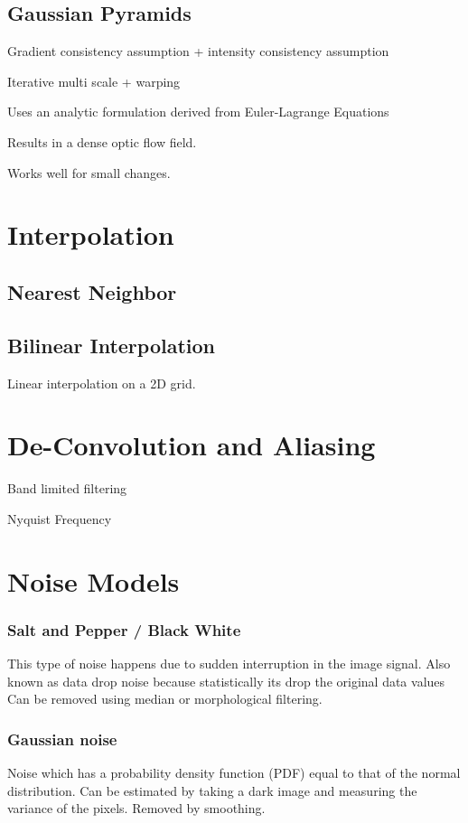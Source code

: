 \subsection{Gaussian Pyramids}

Gradient consistency assumption + intensity consistency assumption

Iterative multi scale + warping

Uses an analytic formulation derived from Euler-Lagrange Equations

Results in a dense optic flow field.

Works well for small changes.

\section{Interpolation}


\subsection{Nearest Neighbor}

\subsection{Bilinear Interpolation}

Linear interpolation on a 2D grid. 

\section{De-Convolution and Aliasing}

Band limited filtering

Nyquist Frequency

\section{Noise Models}

\subsubsection{Salt and Pepper / Black White}
This type of noise happens due to sudden interruption in the image signal.
Also known as data drop noise because statistically its drop the original data values
Can be removed using median or morphological filtering.

\subsubsection{Gaussian noise}
Noise which has a probability density function (PDF) equal to that of the normal distribution.
Can be estimated by taking a dark image and measuring the variance of the pixels. Removed by smoothing.


